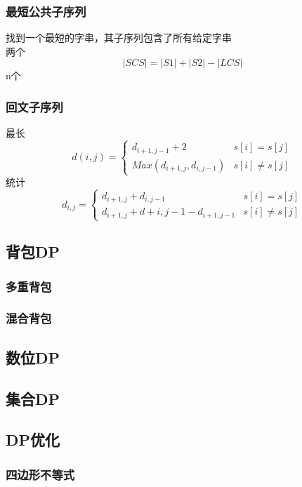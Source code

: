 \documentclass{article}
\begin{document}
\subsubsection{最短公共子序列}
找到一个最短的字串，其子序列包含了所有给定字串	\\
两个
$$ |SCS|=|S1|+|S2|−|LCS| $$
n个

\subsubsection{回文子序列}
最长
$$
d(i,j)= \begin{cases}
d_{i+1,j-1} + 2  &s[i]=s[j] \\
Max(d_{i+1,j},d_{i,j-1}) &s[i] \ne s[j]
\end{cases}
$$
统计
$$
d_{i,j}=
\begin{cases}
d_{i+1,j} + d_{i,j-1}   &s[i]=s[j] \\
d_{i+1,j} + d+{i,j-1} - d_{i+1,j-1}  &s[i] \ne s[j]
\end{cases}
$$

\subsection{背包DP}
\subsubsection{多重背包}

\subsubsection{混合背包}


\subsection{数位DP}

\subsection{集合DP}


\subsection{DP优化}
\subsubsection{四边形不等式}

\end{document}
